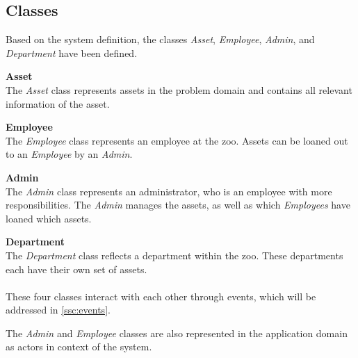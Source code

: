 \subsection{Classes} \label{ssc:classes}

Based on the system definition, the classes \textit{Asset}, \textit{Employee}, \textit{Admin}, and \textit{Department} have been defined.

\textbf{Asset}\\
The \textit{Asset} class represents assets in the problem domain and contains all relevant information of the asset.
\par

\textbf{Employee}\\
The \textit{Employee} class represents an employee at the zoo. Assets can be loaned out to an \textit{Employee} by an \textit{Admin}.
\par

\textbf{Admin}\\
The \textit{Admin} class represents an administrator, who is an employee with more responsibilities. The \textit{Admin} manages the assets, as well as which \textit{Employees} have loaned which assets.
\newpage

\textbf{Department}\\
The \textit{Department} class reflects a department within the zoo. These departments each have their own set of assets. 
\\\\
These four classes interact with each other through events, which will be addressed in \autoref{ssc:events}.
\par
The \textit{Admin} and \textit{Employee} classes are also represented in the application domain as actors in context of the system.


